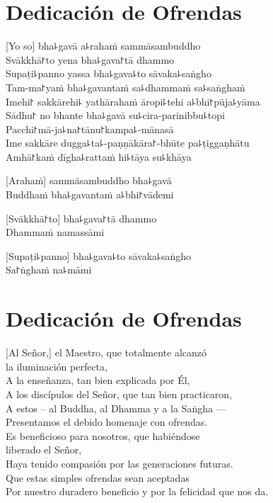 \chapter*{Dedicación de Ofrendas}

\delegateSetUseNext

[Yo so] bha꜕gavā a꜕rahaṁ sammāsambuddho\\
Svākkhā꜓to yena bha꜕gava꜓tā dhammo\\
Supaṭi꜕panno yassa bha꜕gava꜕to sāvaka꜕saṅgho\\
Tam-ma꜓yaṁ bha꜕gavantaṁ sa꜕dhammaṁ sa꜕saṅghaṁ\\
Imehi꜓ sakkārehi꜕ yathārahaṁ āropi꜕tehi a꜕bhi꜓pūja꜕yāma\\
Sādhu꜓ no bhante bha꜕gavā su꜕cira-parinibbu꜕topi\\
Pacchi꜓mā-ja꜕na꜓tānu꜓kampa꜕-mānasā\\
Ime sakkāre dugga꜕ta꜕-paṇṇākāra꜓-bhūte pa꜕ṭiggaṇhātu\\
Amhā꜓kaṁ dīgha꜕rattaṁ hi꜕tāya su꜕khāya

[Arahaṁ] sammāsambuddho bha꜕gavā\\
Buddhaṁ bha꜕gavantaṁ a꜕bhi꜓vādemi 

[Svākkhā꜓to] bha꜕gava꜓tā dhammo\\
Dhammaṁ namassāmi 

[Supaṭi꜕panno] bha꜕gava꜕to sāvaka꜕saṅgho\\
Sa꜓ṅghaṁ na꜕māmi 

\clearpage

\chapter{Dedicación de Ofrendas}

[Al Señor,] el Maestro, que totalmente alcanzó\\
\vin la iluminación perfecta,\\
A la enseñanza, tan bien explicada por Él,\\
A los discípulos del Señor, que tan bien practicaron,\\
A estos – al Buddha, al Dhamma y a la Saṅgha ---\\
Presentamos el debido homenaje con ofrendas.\\
Es beneficioso para nosotros, que habiéndose\\
\vin liberado el Señor,\\
Haya tenido compasión por las generaciones futuras.\\
Que estas simples ofrendas sean aceptadas\\
Por nuestro duradero beneficio y por la felicidad que nos da.

